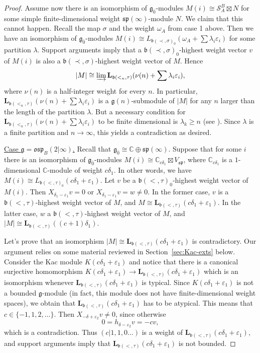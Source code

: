 \documentclass[12pt]{amsart}
\newcommand\C{\mathbb{C}}
\newcommand\g{\mathfrak{g}}
\newcommand\fb{\mathfrak{b}}
\newcommand\fsp{\mathfrak{sp}}
\newcommand\fosp{\mathfrak{osp}}
\newcommand\cS{\mathcal{S}}
\newcommand\bL{\mathbf{L}}
\theoremstyle{plain}
\theoremstyle{definition}
\numberwithin{equation}{section}
\begin{document}
\begin{proof}
Assume now there is an isomorphism of $\g_{\bar 0}$-modules $M(i)\cong \cS_A^B\boxtimes N$ for some simple finite-dimensional weight $\fsp(\infty)$-module $N$. We claim that this cannot happen. Recall the map $\sigma$ and the weight $\omega_A$ from case 1 above. Then we have an isomorphism of $\g_{\bar 0}$-modules $M(i)\cong L_{\fb(\prec,\sigma)_0}(\omega_A + \sum \lambda_i\varepsilon_i)$ for some partition $\lambda$. Support arguments imply that a $\fb(\prec,\sigma)_0$-highest weight vector $v$ of $M(i)$ is also a $\fb(\prec,\sigma)$-highest weight vector of $M$. Hence
	\[
|M|\cong\varinjlim \bL_{\fb(<_n,\tau)}(\nu(n) + \sum \lambda_i\varepsilon_i),
	\]
where $\nu(n)$ is a half-integer weight for every $n$. In particular, $\bL_{\fb(<_n,\tau)}(\nu(n) + \sum \lambda_i\varepsilon_i)$ is a $\g(n)$-submodule of $|M|$ for any $n$ larger than the length of the partition $\lambda$. But a necessary condition for $\bL_{\fb(<_n,\tau)}(\nu(n) + \sum \lambda_i\varepsilon_i)$ to be finite dimensional is $\lambda_k\geq n$ (see \cite[Proposition~2.3]{Kac78}). Since $\lambda$ is a finite partition and $n\to \infty$, this yields a contradiction as desired.



\underline{Case $\g = \fosp_B(2|\infty)$.} Recall that $\g_{\bar 0} \cong \C \oplus \fsp(\infty)$. Suppose that for some $i$ there is an isomorphism of $\g_{\bar 0}$-modules $M(i)\cong \C_{c\delta_1}\boxtimes V_\fsp$, where $\C_{c\delta_1}$ is a $1$-dimensional $\C$-module of weight $c\delta_1$. In other words, we have $M(i)\cong L_{\fb(<,\tau)_0}(c\delta_1 + \varepsilon_1)$. Let $v$ be a $\fb(<,\tau)_0$-highest weight vector of $M(i)$. Then $X_{\delta_1 - \varepsilon_1}v = 0$ or $X_{\delta_1 - \varepsilon_1}v = w\neq 0$. In the former case, $v$ is a $\fb(<,\tau)$-highest weight vector of $M$, and $M\cong \bL_{\fb(<,\tau)}(c\delta_1 + \varepsilon_1)$. In the latter case, $w$ a $\fb(<,\tau)$-highest weight vector of $M$, and $|M|\cong \bL_{\fb(<,\tau)}((c+1)\delta_1)$. 

Let's prove that an isomorphism $|M|\cong \bL_{\fb(<,\tau)}(c\delta_1 + \varepsilon_1)$ is contradictory. Our argument relies on some material reviewed in Section~\ref{sec:Kac-exts} below. Consider the Kac module $K(c\delta_1 + \varepsilon_1)$ and notice that there is a canonical surjective homomorphism $K(c\delta_1 + \varepsilon_1)\to \bL_{\fb(<,\tau)}(c\delta_1 + \varepsilon_1)$ which is an isomorphism whenever $\bL_{\fb(<,\tau)}(c\delta_1 + \varepsilon_1)$ is typical. Since $K(c\delta_1 + \varepsilon_1)$ is not a bounded $\g$-module (in fact, this module does not have finite-dimensional weight spaces), we obtain that $\bL_{\fb(<,\tau)}(c\delta_1 + \varepsilon_1)$ has to be atypical. This means that $c\in \{-1,1,2,\ldots \}$. Then $X_{-\delta + \varepsilon_2}v\neq 0$, since otherwise 
	\[
0=h_{\delta - \varepsilon_2}v=-cv,
	\]
which is a contradiction. Thus $(c|1,1,0\ldots)$ is a weight of $\bL_{\fb(<,\tau)}(c\delta_1 + \varepsilon_1)$, and support arguments imply that $\bL_{\fb(<,\tau)}(c\delta_1 + \varepsilon_1)$ is not bounded. 


\end{proof}
\end{document}
